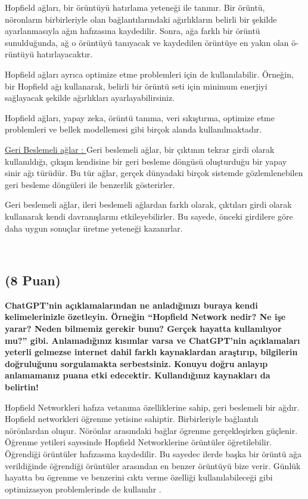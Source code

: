 \documentclass[11pt]{article}
\begin{document}
Hopfield ağları, bir örüntüyü hatırlama yeteneği ile tanınır. 
Bir örüntü, nöronların birbirleriyle olan bağlantılarındaki 
ağırlıkların belirli bir şekilde ayarlanmasıyla ağın 
hafızasına kaydedilir. 
Sonra, ağa farklı bir örüntü sunulduğunda, ağ o örüntüyü 
tanıyacak ve kaydedilen örüntüye en yakın olan ö-
 rüntüyü hatırlayacaktır.

Hopfield ağları ayrıca optimize etme problemleri için de kullanılabilir. Örneğin, bir Hopfield ağı kullanarak, belirli bir örüntü seti için minimum enerjiyi sağlayacak şekilde ağırlıkları ayarlayabilirsiniz.

Hopfield ağları, yapay zeka, örüntü tanıma, veri sıkıştırma, optimize etme problemleri ve bellek modellemesi gibi birçok alanda kullanılmaktadır.

\underline{Geri Beslemeli ağlar : } Geri beslemeli ağlar, bir çıktının tekrar girdi olarak kullanıldığı, çıkışın kendisine bir geri besleme döngüsü oluşturduğu bir yapay sinir ağı türüdür. Bu tür ağlar, gerçek dünyadaki birçok sistemde gözlemlenebilen geri besleme döngüleri ile benzerlik gösterirler.

Geri beslemeli ağlar, ileri beslemeli ağlardan farklı olarak, çıktıları girdi olarak kullanarak kendi davranışlarını etkileyebilirler. Bu sayede, önceki girdilere göre daha uygun sonuçlar üretme yeteneği kazanırlar.




\
\
\ 

\subsection{(8 Puan)} \textbf{ChatGPT’nin açıklamalarından ne anladığınızı buraya kendi kelimelerinizle özetleyin. Örneğin ``Hopfield Network nedir? Ne işe yarar? Neden bilmemiz gerekir bunu? Gerçek hayatta kullanılıyor mu?'' gibi. Anlamadığınız kısımlar varsa ve ChatGPT’nin açıklamaları yeterli gelmezse internet dahil farklı kaynaklardan araştırıp, bilgilerin doğruluğunu sorgulamakta serbestsiniz. Konuyu doğru anlayıp anlamamanız puana etki edecektir. Kullandığınız kaynakları da belirtin!}

Hopfield Networkleri hafıza vetanıma özelliklerine sahip, geri beslemeli bir ağdır. Hopfield networkleri öğrenme yetisine sahiptir. Birbirleriyle bağlantılı nörönlardan oluşur. Nörönlar arasındaki bağlar ögrenme gerçekleşirken güçlenir. 
Öğrenme yetileri sayesinde Hopfield Networklerine örüntüler öğretilebilir. Öğrendiği örüntüler hafızasına kaydedilir. 
Bu sayedec ilerde başka bir örüntü ağa verildiğinde öğrendiği örüntüler arasından en benzer örüntüyü bize verir. Günlük hayatta bu ögrenme ve benzerini cıktı verme özelliği kullanılabileceği gibi optimizasyon problemlerinde de kullanılır . 
\end{document}
